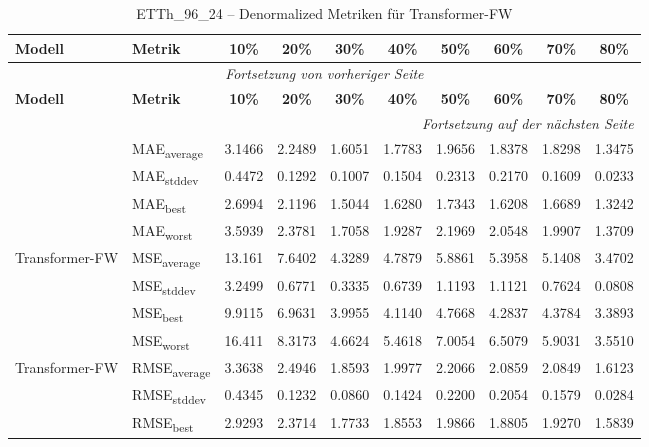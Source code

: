{\small
\begin{longtable}{l l c c c c c c c c}
    \toprule
    \textbf{Modell} & \textbf{Metrik} & \textbf{10\%} & \textbf{20\%} & \textbf{30\%} & \textbf{40\%} & \textbf{50\%} & \textbf{60\%} & \textbf{70\%} & \textbf{80\%} \\
    \midrule
    \endfirsthead
    \multicolumn{10}{c}{\textit{Fortsetzung von vorheriger Seite}} \\
    \toprule
    \textbf{Modell} & \textbf{Metrik} & \textbf{10\%} & \textbf{20\%} & \textbf{30\%} & \textbf{40\%} & \textbf{50\%} & \textbf{60\%} & \textbf{70\%} & \textbf{80\%} \\
    \midrule
    \endhead
    \midrule
    \multicolumn{10}{r}{\textit{Fortsetzung auf der nächsten Seite}} \\
    \midrule
    \endfoot
    \bottomrule
    \caption{ETTh_96_24 -- Denormalized Metriken für Transformer-FW}
    \label{tab:etth_96_24_denormalized_transformer-fw}
    \endlastfoot
\multirow{4}{*}{Transformer-FW} & MAE\textsubscript{average} & 3.1466 & 2.2489 & 1.6051 & 1.7783 & 1.9656 & 1.8378 & 1.8298 & 1.3475 \\
 & MAE\textsubscript{stddev} & 0.4472 & 0.1292 & 0.1007 & 0.1504 & 0.2313 & 0.2170 & 0.1609 & 0.0233 \\
 & MAE\textsubscript{best} & 2.6994 & 2.1196 & 1.5044 & 1.6280 & 1.7343 & 1.6208 & 1.6689 & 1.3242 \\
 & MAE\textsubscript{worst} & 3.5939 & 2.3781 & 1.7058 & 1.9287 & 2.1969 & 2.0548 & 1.9907 & 1.3709 \\
\cmidrule(lr){2-10}
\multirow{4}{*}{Transformer-FW} & MSE\textsubscript{average} & 13.161 & 7.6402 & 4.3289 & 4.7879 & 5.8861 & 5.3958 & 5.1408 & 3.4702 \\
 & MSE\textsubscript{stddev} & 3.2499 & 0.6771 & 0.3335 & 0.6739 & 1.1193 & 1.1121 & 0.7624 & 0.0808 \\
 & MSE\textsubscript{best} & 9.9115 & 6.9631 & 3.9955 & 4.1140 & 4.7668 & 4.2837 & 4.3784 & 3.3893 \\
 & MSE\textsubscript{worst} & 16.411 & 8.3173 & 4.6624 & 5.4618 & 7.0054 & 6.5079 & 5.9031 & 3.5510 \\
\cmidrule(lr){2-10}
\multirow{4}{*}{Transformer-FW} & RMSE\textsubscript{average} & 3.3638 & 2.4946 & 1.8593 & 1.9977 & 2.2066 & 2.0859 & 2.0849 & 1.6123 \\
 & RMSE\textsubscript{stddev} & 0.4345 & 0.1232 & 0.0860 & 0.1424 & 0.2200 & 0.2054 & 0.1579 & 0.0284 \\
 & RMSE\textsubscript{best} & 2.9293 & 2.3714 & 1.7733 & 1.8553 & 1.9866 & 1.8805 & 1.9270 & 1.5839 \\

\end{longtable}}
